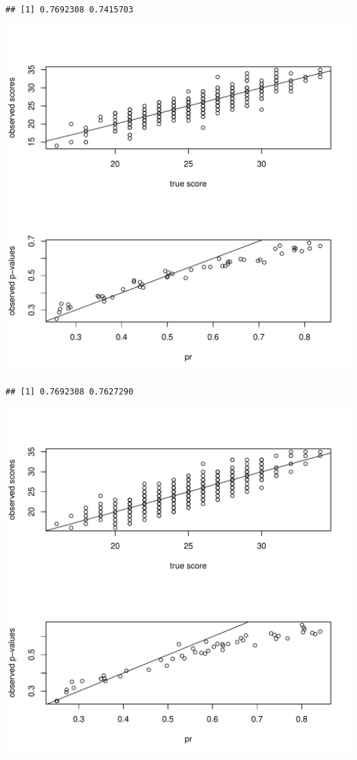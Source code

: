 \documentclass{article}\usepackage[]{graphicx}\usepackage[]{color}
\makeatletter
\def\maxwidth{ %
  \ifdim\Gin@nat@width>\linewidth
    \linewidth
  \else
    \Gin@nat@width
  \fi
}
\newenvironment{kframe}{%
 \def\at@end@of@kframe{}%
 \ifinner\ifhmode%
  \def\at@end@of@kframe{\end{minipage}}%
  \begin{minipage}{\columnwidth}%
 \fi\fi%
 \def\FrameCommand##1{\hskip\@totalleftmargin \hskip-\fboxsep
 \colorbox{shadecolor}{##1}\hskip-\fboxsep
     \hskip-\linewidth \hskip-\@totalleftmargin \hskip\columnwidth}%
 \MakeFramed {\advance\hsize-\width
   \@totalleftmargin\z@ \linewidth\hsize
   \@setminipage}}%
 {\par\unskip\endMakeFramed%
 \at@end@of@kframe}
\newenvironment{knitrout}{}{} %
\makeatother
\begin{document}
\begin{knitrout}
\begin{kframe}\begin{verbatim}
## [1] 0.7692308 0.7415703
\end{verbatim}
\end{kframe}
\includegraphics[width=\maxwidth]{figure/unnamed-chunk-2-6} 
\begin{kframe}\begin{verbatim}
## [1] 0.7692308 0.7627290
\end{verbatim}
\end{kframe}
\includegraphics[width=\maxwidth]{figure/unnamed-chunk-2-7} 

\end{knitrout}
\end{document}
